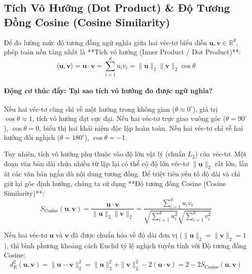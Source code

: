 \subsection{Tích Vô Hướng (Dot Product) \& Độ Tương Đồng Cosine (Cosine Similarity)}
Để đo lường mức độ tương đồng ngữ nghĩa giữa hai véc-tơ biểu diễn $\mathbf{u}, \mathbf{v} \in \mathbb{R}^d$, phép toán nền tảng nhất là **Tích vô hướng (Inner Product / Dot Product)**:
\begin{equation}
\langle \mathbf{u}, \mathbf{v} \rangle = \mathbf{u} \cdot \mathbf{v} = \sum_{i=1}^d u_i v_i = \|\mathbf{u}\|_2 \|\mathbf{v}\|_2 \cos \theta
\label{eq:dot-product-def}
\end{equation}

\paragraph{Động cơ thúc đẩy: Tại sao tích vô hướng đo được ngữ nghĩa?}
Nếu hai véc-tơ cùng chỉ về một hướng trong không gian ($\theta \approx 0^\circ$), giá trị $\cos \theta \approx 1$, tích vô hướng đạt cực đại. Nếu hai véc-tơ trực giao vuông góc ($\theta = 90^\circ$), $\cos \theta = 0$, biểu thị hai khái niệm độc lập hoàn toàn. Nếu hai véc-tơ chỉ về hai hướng đối nghịch ($\theta = 180^\circ$), $\cos \theta = -1$.

Tuy nhiên, tích vô hướng phụ thuộc vào độ lớn vật lý (chuẩn $L_2$) của véc-tơ. Một đoạn văn bản dài chứa nhiều từ lặp lại có thể có độ lớn véc-tơ $\|\mathbf{u}\|_2$ rất lớn, lấn át các văn bản ngắn dù nội dung tương đồng. Để triệt tiêu yếu tố độ dài và chỉ giữ lại góc định hướng, chúng ta sử dụng **Độ tương đồng Cosine (Cosine Similarity)**:
\begin{equation}
S_{\text{Cosine}}(\mathbf{u}, \mathbf{v}) = \frac{\mathbf{u} \cdot \mathbf{v}}{\|\mathbf{u}\|_2 \|\mathbf{v}\|_2} = \frac{\sum_{i=1}^d u_i v_i}{\sqrt{\sum_{i=1}^d u_i^2} \sqrt{\sum_{i=1}^d v_i^2}}
\label{eq:cosine-similarity-def}
\end{equation}

\begin{theorem}
Nếu hai véc-tơ $\mathbf{u}$ và $\mathbf{v}$ đã được chuẩn hóa về độ dài đơn vị ($\|\mathbf{u}\|_2 = \|\mathbf{v}\|_2 = 1$), thì bình phương khoảng cách Euclid tỷ lệ nghịch tuyến tính với Độ tương đồng Cosine:
\begin{equation}
d_E^2(\mathbf{u}, \mathbf{v}) = \|\mathbf{u} - \mathbf{v}\|_2^2 = \|\mathbf{u}\|_2^2 + \|\mathbf{v}\|_2^2 - 2(\mathbf{u} \cdot \mathbf{v}) = 2 - 2 S_{\text{Cosine}}(\mathbf{u}, \mathbf{v})
\end{equation}
\end{theorem}

